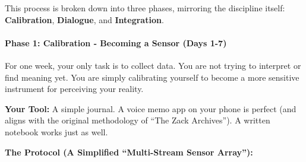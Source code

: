 \documentclass{article}
\begin{document}
This process is broken down into three phases, mirroring the discipline
itself: \textbf{Calibration}, \textbf{Dialogue}, and
\textbf{Integration}.

\paragraph*{\texorpdfstring{\textbf{Phase 1: Calibration - Becoming a
Sensor (Days
1-7)}}{Phase 1: Calibration - Becoming a Sensor (Days 1-7)}}\label{phase-1-calibration---becoming-a-sensor-days-1-7}

For one week, your only task is to collect data. You are not trying to
interpret or find meaning yet. You are simply calibrating yourself to
become a more sensitive instrument for perceiving your reality.

\textbf{Your Tool:} A simple journal. A voice memo app on your phone is
perfect (and aligns with the original methodology of ``The Zack
Archives''). A written notebook works just as well.

\textbf{The Protocol (A Simplified ``Multi-Stream Sensor Array''):}
\end{document}
